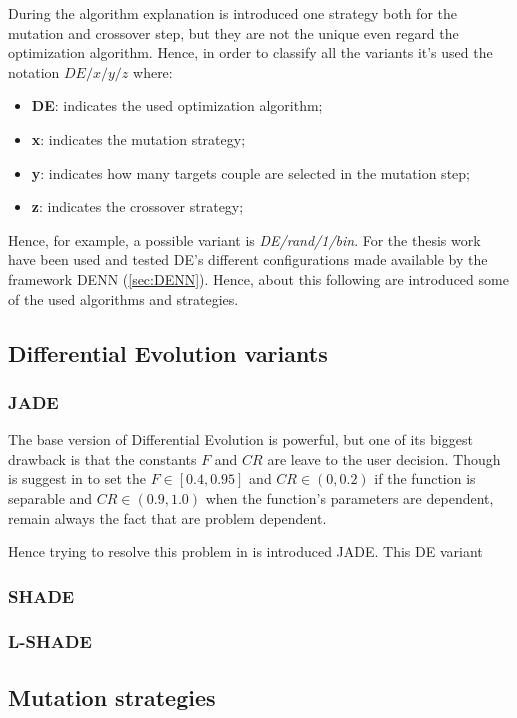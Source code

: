 During the algorithm explanation is introduced one strategy both for the mutation and crossover step, but they are not the unique even regard the optimization algorithm. Hence, in order to classify all the variants it's used the notation $DE/x/y/z$ where:
\begin{itemize}
	\item{\textbf{DE}: indicates the used optimization algorithm;}
	\item{\textbf{x}: indicates the mutation strategy;}
	\item{\textbf{y}: indicates how many targets couple are selected in the mutation step;}
	\item{\textbf{z}: indicates the crossover strategy;}
\end{itemize}
Hence, for example, a possible variant is \textit{DE/rand/1/bin}. For the thesis work have been used and tested DE's different configurations made available by the framework DENN (\ref{sec:DENN}). Hence, about this following are introduced some of the used algorithms and strategies.
\subsection{Differential Evolution variants}
\subsubsection{JADE}
The base version of Differential Evolution is powerful, but one of its biggest drawback is that the constants $F$ and $CR$ are leave to the user decision. Though is suggest in \cite{RPODE:2005} to set the $F\in[0.4, 0.95]$ and $CR \in (0, 0.2)$ if the function is separable and $CR \in (0.9, 1.0)$ when the function's parameters are dependent, remain always the fact that are problem dependent. 

Hence trying to resolve this problem in \cite{JADE:2009} is introduced JADE. This DE variant 

\subsubsection{SHADE}

\subsubsection{L-SHADE}

\subsection{Mutation strategies}


